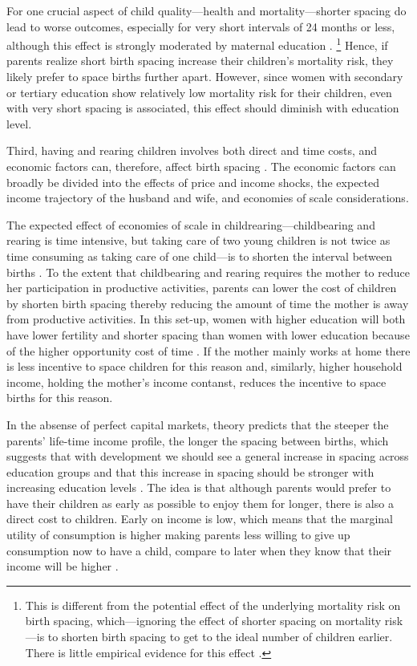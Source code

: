 For one crucial aspect of child quality---health and mortality---shorter spacing 
do lead to worse outcomes, especially for very short intervals of 24 months or less,
although this effect is strongly moderated by maternal education
\citep{Whitworth2002,Conde-Agudelo2006,Conde-Agudelo2012,Molitoris2019}.%
\footnote{
This is different from the potential effect of the underlying mortality risk on birth 
spacing, which---ignoring the effect of shorter spacing on mortality risk---is to shorten 
birth spacing to get to the ideal number of children earlier.
There is little empirical evidence for this effect \citep{Newman1983,Newman1988,Bhalotra2008}.
}
Hence, if parents realize short birth spacing increase their children's mortality risk, 
they likely prefer to space births further apart.
However, since women with secondary or tertiary education show relatively low mortality 
risk for their children, even with very short spacing is associated, this effect should
diminish with education level.


Third, having and rearing children involves both direct and time costs, and economic 
factors can, therefore, affect birth spacing \citep{Hotz1997,Schultz1997}.
The economic factors can broadly be divided into 
the effects of price and income shocks,
the expected income trajectory of the husband and wife,
and economies of scale considerations.

The expected effect of economies of scale in childrearing---childbearing and rearing is
time intensive, but taking care of two young children is not twice as time consuming as 
taking care of one child---is to shorten the interval between births
\citep{Vijverberg1982,Espenshade1984}.
To the extent that childbearing and rearing requires the mother to reduce her participation 
in productive activities, parents can lower the cost of children by shorten birth spacing 
thereby reducing the amount of time the mother is away from productive activities.
In this set-up, women with higher education will both have lower fertility and shorter
spacing than women with lower education because of the higher opportunity cost of time 
\citep{Ross1974,Newman1981,Newman1984}.
If the mother mainly works at home there is less incentive to space children for this 
reason and, similarly, higher household income, holding the mother's income contanst, 
reduces the incentive to space births for this reason.

In the absense of perfect capital markets, theory predicts that the steeper the parents'
life-time income profile, the longer the spacing between births, which suggests that 
with development we should see a general increase in spacing across education 
groups and that this increase in spacing should be stronger with increasing education levels
\citep{Heckman1976,Wolpin1984,Newman1988}.
The idea is that although parents would prefer to have their children as early as possible 
to enjoy them for longer, there is also a direct cost to children.
Early on income is low, which means that the marginal utility of consumption is higher 
making parents less willing to give up consumption now to have a child, compare to later 
when they know that their income will be higher \citep{Newman1984,Happel1984}.


